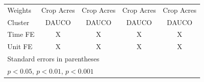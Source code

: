 \begin{table}[htbp]
\begin{tabular}{l*{4}{c}}
Weights             &  Crop Acres         &  Crop Acres         &  Crop Acres         &  Crop Acres         \\
Cluster             &       DAUCO         &       DAUCO         &       DAUCO         &       DAUCO         \\
Time FE             &           X         &           X         &           X         &           X         \\
Unit FE             &           X         &           X         &           X         &           X         \\
\hline\hline
\multicolumn{5}{l}{\footnotesize Standard errors in parentheses}\\
\multicolumn{5}{l}{\footnotesize \sym{*} \(p<0.05\), \sym{**} \(p<0.01\), \sym{***} \(p<0.001\)}\\
\end{tabular}
\end{table}
